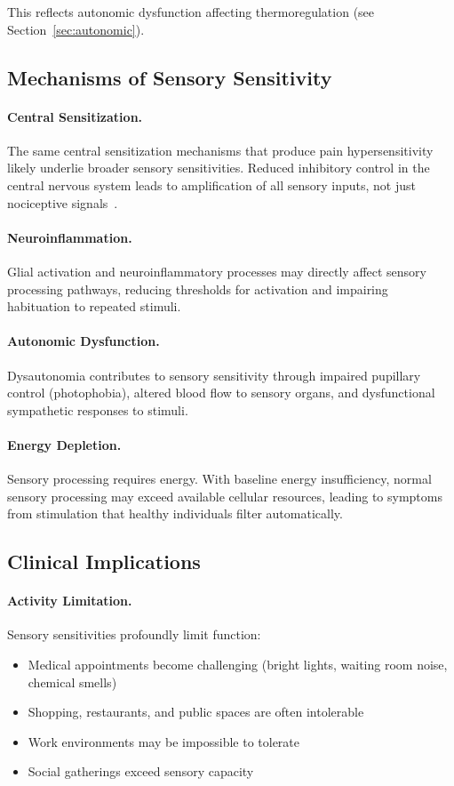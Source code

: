 This reflects autonomic dysfunction affecting thermoregulation (see Section~\ref{sec:autonomic}).

\subsection{Mechanisms of Sensory Sensitivity}
\label{subsec:sensory-mechanisms}

\paragraph{Central Sensitization.}
The same central sensitization mechanisms that produce pain hypersensitivity likely underlie broader sensory sensitivities. Reduced inhibitory control in the central nervous system leads to amplification of all sensory inputs, not just nociceptive signals~\cite{Nijs2017neuroinflammation}.

\paragraph{Neuroinflammation.}
Glial activation and neuroinflammatory processes may directly affect sensory processing pathways, reducing thresholds for activation and impairing habituation to repeated stimuli.

\paragraph{Autonomic Dysfunction.}
Dysautonomia contributes to sensory sensitivity through impaired pupillary control (photophobia), altered blood flow to sensory organs, and dysfunctional sympathetic responses to stimuli.

\paragraph{Energy Depletion.}
Sensory processing requires energy. With baseline energy insufficiency, normal sensory processing may exceed available cellular resources, leading to symptoms from stimulation that healthy individuals filter automatically.

\subsection{Clinical Implications}
\label{subsec:sensory-implications}

\paragraph{Activity Limitation.}
Sensory sensitivities profoundly limit function:
\begin{itemize}
    \item Medical appointments become challenging (bright lights, waiting room noise, chemical smells)
    \item Shopping, restaurants, and public spaces are often intolerable
    \item Work environments may be impossible to tolerate
    \item Social gatherings exceed sensory capacity
\end{itemize}

